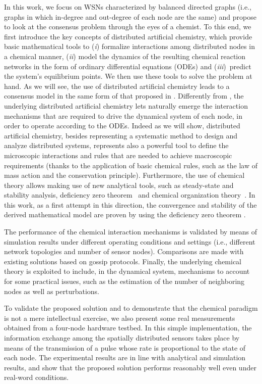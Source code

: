 \documentclass[journal]{IEEEtran}
\begin{document}
{{In this work, we focus on WSNs characterized by balanced directed graphs (i.e., graphs in which in-degree and out-degree of each node are the same) and propose to look at the consensus problem through the eyes of a chemist. To this end, we first introduce the key concepts of distributed artificial chemistry, which provide {basic mathematical tools} to (\emph{i}) formalize interactions among distributed nodes in a chemical manner, (\emph{ii}) model the dynamics of the resulting chemical reaction networks in the form of ordinary differential equations (ODEs) and (\emph{iii})~predict the system's equilibrium points. We  then use these tools to solve the problem at hand. 
As we will see, the use of distributed artificial chemistry leads to a consensus model in the same form of that proposed in \cite{OlFa07}. Differently from \cite{OlFa07}, the underlying distributed artificial chemistry lets naturally emerge the interaction mechanisms that are required to drive the dynamical system of each node, in order to operate according to the ODEs. 
Indeed as we will show, distributed artificial chemistry, besides representing a systematic method to design and analyze distributed systems, represents also a powerful tool to define the microscopic interactions and rules that are needed to achieve macroscopic requirements (thanks to the application of basic chemical rules, such as the law of mass action and the conservation principle). 
Furthermore, the use of chemical theory allows making use of new analytical tools, such as steady-state and stability analysis, deficiency zero theorem~\cite{MaHo74} and chemical organization theory~\cite{DiSp07}. In this work, as a first attempt in this direction, the convergence and stability of the derived mathematical model are proven by using the deficiency zero theorem \cite{Fe72}. 

The performance of the chemical interaction mechanisms is validated by means of simulation results under different operating conditions and settings (i.e., different network topologies and number of sensor nodes). Comparisons are made with existing solutions based on gossip protocols. Finally, the underlying chemical theory is exploited to include, in the dynamical system, mechanisms to account for some practical issues, such as the estimation of the number of neighboring nodes as well as perturbations. } 

To validate the proposed solution and to demonstrate that the chemical paradigm is not a mere intellectual exercise, we also present some real measurements obtained from a four-node hardware testbed. In this simple implementation, the information exchange among the spatially distributed sensors takes place by means of the transmission of a pulse whose rate is proportional to the state of each node. The experimental results are in line with analytical and simulation results, and show that the proposed solution performs reasonably well even under real-word conditions. 

}
\end{document}
